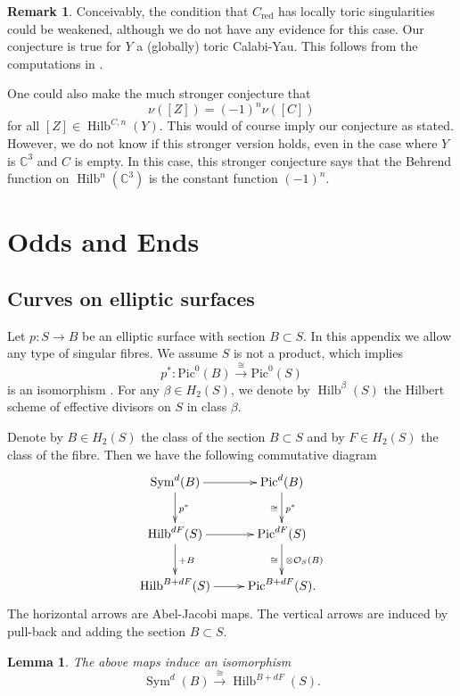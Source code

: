 \documentclass{amsart}
\newtheorem{lemma}[theorem]{Lemma}
\theoremstyle{definition}
\newtheorem{remark}[theorem]{Remark}
\newcommand{\CC} {\mathbb{C}}          %
\renewcommand{\O}{\mathcal{O}}
\newcommand{\Pic}{\mathrm{Pic}}
\newcommand{\Sym}{\operatorname{Sym}}
\newcommand{\Hilb}{\operatorname{Hilb}}
\newcommand{\red}{\mathrm{red}}
\begin{document}
\begin{remark}
Conceivably, the condition that $C_{\red}$ has locally toric
singularities could be weakened, although we do not have any evidence
for this case. Our conjecture is true for $Y$ a (globally) toric
Calabi-Yau. This follows from the computations in \cite{MNOP1}.

One could also make the much stronger conjecture that 
\[
\nu ([Z]) = (-1)^{n} \nu ([C])
\]
for all $[Z]\in \Hilb^{C,n}(Y)$. This would of course imply our
conjecture as stated. However, we do not know if this stronger version
holds, even in the case where $Y$ is $\CC^{3}$ and $C$ is empty. In
this case, this stronger conjecture says that the Behrend function
on $\Hilb^{n}(\CC^{3})$ is the constant function $(-1)^{n}$.
\end{remark}



\appendix
\section{Odds and Ends}\label{appendix: odds and ends}

\subsection{Curves on elliptic surfaces}\label{appHilb}

Let $p : S \rightarrow B$ be an elliptic surface with section $B \subset S$. In this appendix we allow any type of singular fibres. We assume $S$ is not a product, which implies
$$
p^* : \Pic^0(B) \stackrel{\cong}{\longrightarrow} \Pic^0(S)
$$
is an isomorphism \cite[VII.1.1]{Mir}. For any $\beta \in H_2(S)$, we denote by $\Hilb^\beta(S)$ the Hilbert scheme of effective divisors on $S$ in class $\beta$. 

Denote by $B \in H_2(S)$ the class of the section $B \subset S$ and by $F \in H_2(S)$ the class of the fibre. Then we have the following commutative diagram 
\begin{displaymath}
\xymatrix
{
\Sym^d(B) \ar[d]^{p^*} \ar[r] & \Pic^d(B) \ar[d]^{p^*}_{\cong} \\
\Hilb^{dF}(S) \ar[d]^{+B} \ar[r] & \Pic^{dF}(S) \ar[d]^{\otimes \O_S(B)}_{\cong} \\
\Hilb^{B+dF}(S) \ar[r] & \Pic^{B+dF}(S). 
}
\end{displaymath}
The horizontal arrows are Abel-Jacobi maps. The vertical arrows are induced by pull-back and adding the section $B \subset S$. 
\begin{lemma} \label{Hilbcvs}
The above maps induce an isomorphism
$$
\Sym^d(B) \stackrel{\cong}{\longrightarrow} \Hilb^{B+dF}(S).
$$
\end{lemma}
\end{document}
